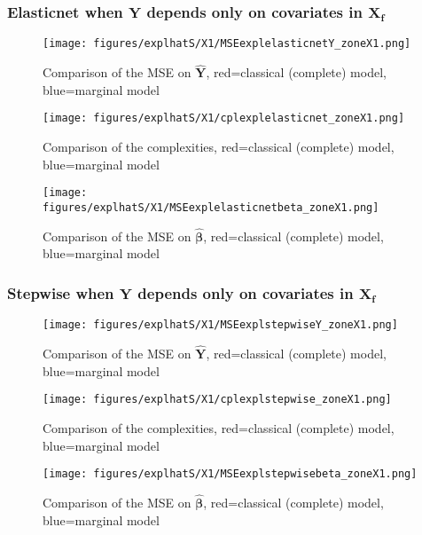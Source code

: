 \documentclass[12pt,a4paper]{report}
\begin{document}
\subsubsection{Elasticnet when $\boldsymbol{Y}$ depends only on covariates in $\boldsymbol{X_f}$}

	\begin{figure}[h!]
	\centering
		  \texttt{[image: figures/explhatS/X1/MSEexplelasticnetY\_zoneX1.png]}
		\caption{Comparison of the MSE on $\hat{\boldsymbol{Y}}$, red=classical (complete) model, blue=marginal model}\label{MSEexplelasticnetY_zoneX1}
	\end{figure}
	\begin{figure}[h!]
	\centering
		  \texttt{[image: figures/explhatS/X1/cplexplelasticnet\_zoneX1.png]}
		\caption{Comparison of the complexities, red=classical (complete) model, blue=marginal model}\label{cplexplelasticnet_zoneX1}
	\end{figure}
	\begin{figure}[h!]
	\centering
		  \texttt{[image: figures/explhatS/X1/MSEexplelasticnetbeta\_zoneX1.png]}
		\caption{Comparison of the MSE on $\hat{\boldsymbol{\beta}}$, red=classical (complete) model, blue=marginal model}\label{MSEexplelasticnetbeta_zoneX1}
	\end{figure}
	\FloatBarrier
\newpage
\subsubsection{Stepwise when $\boldsymbol{Y}$ depends only on covariates in $\boldsymbol{X_f}$}

	\begin{figure}[h!]
	\centering
		  \texttt{[image: figures/explhatS/X1/MSEexplstepwiseY\_zoneX1.png]}
		\caption{Comparison of the MSE on $\hat{\boldsymbol{Y}}$, red=classical (complete) model, blue=marginal model}\label{MSEexplstepwiseY_zoneX1}
	\end{figure}
	\begin{figure}[h!]
	\centering
		  \texttt{[image: figures/explhatS/X1/cplexplstepwise\_zoneX1.png]}
		\caption{Comparison of the complexities, red=classical (complete) model, blue=marginal model}\label{cplexplstepwise_zoneX1}
	\end{figure}
	\begin{figure}[h!]
	\centering
		  \texttt{[image: figures/explhatS/X1/MSEexplstepwisebeta\_zoneX1.png]}
		\caption{Comparison of the MSE on $\hat{\boldsymbol{\beta}}$, red=classical (complete) model, blue=marginal model}\label{MSEexplstepwisebeta_zoneX1}
	\end{figure}
	\FloatBarrier
\newpage
\end{document}
